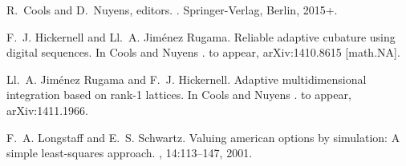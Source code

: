 \documentclass[]{elsarticle}
\theoremstyle{definition}
\begin{document}

%
%
\def\Ignore#1{}\def\notesupp#1{}\def\Ignore#1{}\def\notesupp#1{}\providecommand{\HickernellFJ}{Hickernell\xspace}
\begin{thebibliography}{1}

R.~Cools and D.~Nuyens, editors.
.
  Springer-Verlag, Berlin, 2015+.

F.~J. \HickernellFJ and {\relax Ll}.~A. {Jim\'enez Rugama}.
\newblock Reliable adaptive cubature using digital sequences.
\newblock In Cools and Nuyens \cite{CooNuy16a}.
\newblock to appear, arXiv:1410.8615 [math.NA].

{\relax Ll}.~A. {Jim\'enez Rugama} and F.~J. \HickernellFJ.
\newblock Adaptive multidimensional integration based on rank-1 lattices.
\newblock In Cools and Nuyens \cite{CooNuy16a}.
\newblock to appear, arXiv:1411.1966.

F.~A. Longstaff and E.~S. Schwartz.
\newblock Valuing american options by simulation: A simple least-squares
  approach.
, 14:113--147, 2001.

\end{thebibliography}
\end{document}
